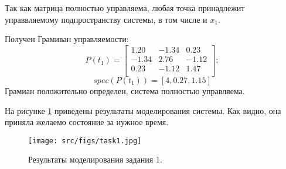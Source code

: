 Так как матрица полностью управляема, любая точка принадлежит управвляемому подпространству системы, в том числе и \(x_1\).

Получен Грамиван управляемости:
\[
        P(t_1) = \begin{bmatrix}
        1.20 & -1.34 & 0.23 \\
        -1.34 & 2.76 & -1.12 \\
        0.23 & -1.12 & 1.47 \\
        \end{bmatrix};
\]
\[
        spec(P(t_1)) = [4, 0.27, 1.15]
\]Грамиан положительно определен, система полностью управляема.

На рисунке \ref{fig:task1} приведены результаты моделирования системы. Как видно, она приняла желаемо состояние за нужное время.
\begin{figure}[ht!]
        \centering
        \texttt{[image: src/figs/task1.jpg]}
        \caption{Результаты моделирования задания 1.}
        \label{fig:task1}
\end{figure}


